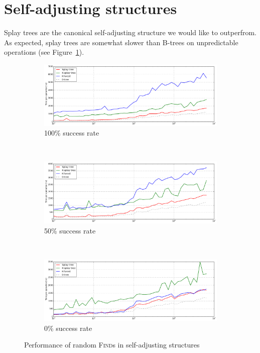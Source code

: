 \section{Self-adjusting structures}
Splay trees are the canonical self-adjusting structure we would like to
outperfrom. As expected, splay trees are somewhat slower than B-trees on
unpredictable operations (see Figure~\ref{fig:self-adj-performance-finds}).

\begin{figure}
\begin{subfigure}[t]{\textwidth}
	\includegraphics[width=\textwidth]{img/performance/self-adj-random-find-100}
	\caption{100\% success rate}
\end{subfigure}
\\
\begin{subfigure}[t]{\textwidth}
	\includegraphics[width=\textwidth]{img/performance/self-adj-random-find-50}
	\caption{50\% success rate}
\end{subfigure}
\\
\begin{subfigure}[t]{\textwidth}
	\includegraphics[width=\textwidth]{img/performance/self-adj-random-find-0}
	\caption{0\% success rate}
\end{subfigure}
\caption{Performance of random \textsc{Find}s in self-adjusting structures}
\label{fig:self-adj-performance-finds}
\end{figure}

